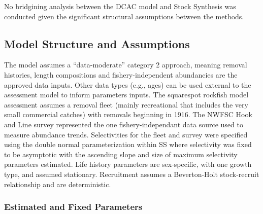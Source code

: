 \documentclass[11pt,
  english,
  a4paper,
]{article}
\begin{document}
\leavevmode\tagmcend\tagstructend


No bridgining analysis between the DCAC model and Stock Synthesis was conducted given the significant structural assumptions between the methods.

\leavevmode\tagmcend\tagstructend\par


\hypertarget{model-structure-and-assumptions}{%
\subsection{Model Structure and Assumptions}\label{model-structure-and-assumptions}}

\leavevmode\tagmcend\tagstructend


The model assumes a ``data-moderate'' category 2 approach, meaning removal histories, length compositions and fishery-independent abundancies are the approved data inputs. Other data types (e.g., ages) can be used external to the assessment model to inform parameters inputs. The squarespot rockfish model assessment assumes a removal fleet (mainly recreational that includes the very small commercial catches) with removals beginning in 1916. The NWFSC Hook and Line survey represented the one fishery-independant data source used to measure abundance trends. Selectivities for the fleet and survey were specified using the double normal parameterization within SS where selectivity was fixed to be asymptotic with the ascending slope and size of maximum selectivity parameters estimated. Life history parameters are sex-specific, with one growth type, and assumed stationary. Recruitment assumes a Beverton-Holt stock-recruit relationship and are deterministic.

\leavevmode\tagmcend\tagstructend\par


\hypertarget{estimated-and-fixed-parameters}{%
\subsubsection{Estimated and Fixed Parameters}\label{estimated-and-fixed-parameters}}

\leavevmode\tagmcend\tagstructend
\end{document}
